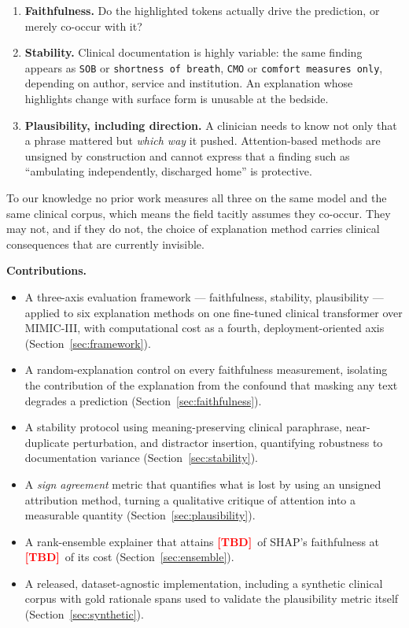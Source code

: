 \documentclass[conference]{IEEEtran}
\newif\ifdraftnums\draftnumstrue   %
\newcommand{\TBD}{\ifdraftnums\textcolor{red}{\textbf{[TBD]}}\else--\fi}
\begin{document}
\begin{enumerate}
\item \textbf{Faithfulness.} Do the highlighted tokens actually drive the
      prediction, or merely co-occur with it?
\item \textbf{Stability.} Clinical documentation is highly variable: the same
      finding appears as \texttt{SOB} or \texttt{shortness of breath},
      \texttt{CMO} or \texttt{comfort measures only}, depending on author,
      service and institution. An explanation whose highlights change with
      surface form is unusable at the bedside.
\item \textbf{Plausibility, including direction.} A clinician needs to know not
      only that a phrase mattered but \emph{which way} it pushed. Attention-based
      methods are unsigned by construction and cannot express that a finding such
      as ``ambulating independently, discharged home'' is protective.
\end{enumerate}

To our knowledge no prior work measures all three on the same model and the same
clinical corpus, which means the field tacitly assumes they co-occur. They may
not, and if they do not, the choice of explanation method carries clinical
consequences that are currently invisible.

\medskip\noindent\textbf{Contributions.}
\begin{itemize}
\item A three-axis evaluation framework --- faithfulness, stability,
      plausibility --- applied to six explanation methods on one fine-tuned
      clinical transformer over MIMIC-III, with computational cost as a fourth,
      deployment-oriented axis (Section~\ref{sec:framework}).
\item A random-explanation control on every faithfulness measurement, isolating
      the contribution of the explanation from the confound that masking any
      text degrades a prediction (Section~\ref{sec:faithfulness}).
\item A stability protocol using meaning-preserving clinical paraphrase,
      near-duplicate perturbation, and distractor insertion, quantifying
      robustness to documentation variance (Section~\ref{sec:stability}).
\item A \emph{sign agreement} metric that quantifies what is lost by using an
      unsigned attribution method, turning a qualitative critique of attention
      into a measurable quantity (Section~\ref{sec:plausibility}).
\item A rank-ensemble explainer that attains \TBD\ of SHAP's faithfulness at
      \TBD\ of its cost (Section~\ref{sec:ensemble}).
\item A released, dataset-agnostic implementation, including a synthetic clinical
      corpus with gold rationale spans used to validate the plausibility metric
      itself (Section~\ref{sec:synthetic}).
\end{itemize}
\end{document}

